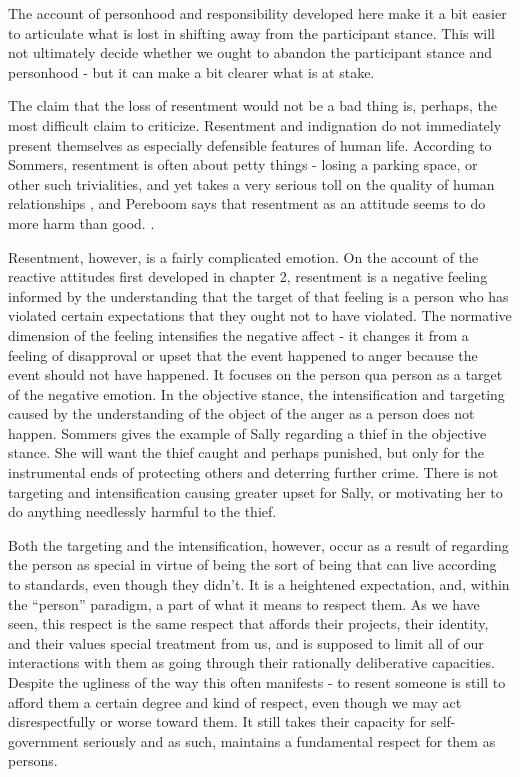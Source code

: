 \documentclass[phd,12pt,oneside,paper=letterpaper]{ubcthesis}
\begin{document}
The account of personhood and responsibility developed here make it a bit easier to articulate what is lost in shifting away from the participant stance. This will not ultimately decide whether we ought to abandon the participant stance and personhood - but it can make a bit clearer what is at stake. 

The claim that the loss of resentment would not be a bad thing is, perhaps, the most difficult claim to criticize. Resentment and indignation do not immediately present themselves as especially defensible features of human life. According to Sommers, resentment is often about petty things - losing a parking space, or other such trivialities, and yet takes a very serious toll on the quality of human relationships \citep{sommers2007}, and Pereboom says that resentment as an attitude seems to do more harm than good. \citep[p.200]{pereboom2001}. 

Resentment, however, is a fairly complicated emotion. On the account of the reactive attitudes first developed in chapter 2, resentment is a negative feeling informed by the understanding that the target of that feeling is a person who has violated certain expectations that they ought not to have violated. The normative dimension of the feeling intensifies the negative affect - it changes it from a feeling of disapproval or upset that the event happened to anger because the event should not have happened. It focuses on the person qua person as a target of the negative emotion. In the objective stance, the intensification and targeting caused by the understanding of the object of the anger as a person does not happen. Sommers gives the example of Sally regarding a thief in the objective stance. She will want the thief caught and perhaps punished, but only for the instrumental ends of protecting others and deterring further crime. There is not targeting and intensification causing greater upset for Sally, or motivating her to do anything needlessly harmful to the thief. \citep[p.327-8]{sommers2007}

Both the targeting and the intensification, however, occur as a result of regarding the person as special in virtue of being the sort of being that can live according to standards, even though they didn't. It is a heightened expectation, and, within the ``person'' paradigm, a part of what it means to respect them. As we have seen, this respect is the same respect that affords their projects, their identity, and their values special treatment from us, and is supposed to limit all of our interactions with them as going through their rationally deliberative capacities. Despite the ugliness of the way this often manifests - to resent someone is still to afford them a certain degree and kind of respect, even though we may act disrespectfully or worse toward them. It still takes their capacity for self-government seriously and as such, maintains a fundamental respect for them as persons. 
\end{document}
